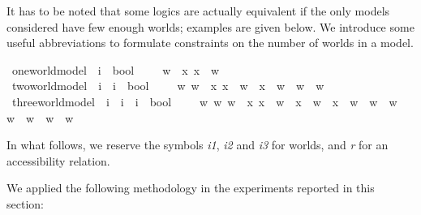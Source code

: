 \begin{isabellebody}
\begin{isamarkuptext}
It has to be noted that some logics are actually equivalent if the only models considered have few
enough worlds; examples are given below. We introduce some useful abbreviations to formulate
constraints on the number of worlds in a model.%
\end{isamarkuptext}%
\isamarkuptrue%
\isamarkupfalse%
\ one{\isacharunderscore}world{\isacharunderscore}model\ {\isacharcolon}{\isacharcolon}\ {\isachardoublequoteopen}i\ {\isasymRightarrow}\ bool{\isachardoublequoteclose}\ \ \ \ {\isachardoublequoteopen}{\isacharhash}\ w{}\ {\isasymequiv}\ {\isasymforall}x{\isachardot}\ x\ {\isacharequal}\ w{}{\isachardoublequoteclose}\isanewline
{}\isamarkupfalse%
\ two{\isacharunderscore}world{\isacharunderscore}model\ {\isacharcolon}{\isacharcolon}\ {\isachardoublequoteopen}i\ {\isasymRightarrow}\ i\ {\isasymRightarrow}\ bool{\isachardoublequoteclose}\ \ \ \ {\isachardoublequoteopen}{\isacharhash}\ w{}\ w{}\ {\isasymequiv}\ {\isacharparenleft}{\isasymforall}x{\isachardot}\ x\ {\isacharequal}\ w{}\ {\isasymor}\ x\ {\isacharequal}\ w{}{\isacharparenright}\ {\isasymand}\ w{}\ {\isasymnoteq}\ w{}{\isachardoublequoteclose}\ \isanewline
{}\isamarkupfalse%
\ three{\isacharunderscore}world{\isacharunderscore}model\ {\isacharcolon}{\isacharcolon}\ {\isachardoublequoteopen}i\ {\isasymRightarrow}\ i\ {\isasymRightarrow}\ i\ {\isasymRightarrow}\ bool{\isachardoublequoteclose}\ \ \ \ {\isachardoublequoteopen}{\isacharhash}\ w{}\ w{}\ w{}\ {\isasymequiv}\ {\isacharparenleft}{\isasymforall}x{\isachardot}\ x\ {\isacharequal}\ w{}\ {\isasymor}\ x\ {\isacharequal}\ w{}\ {\isasymor}\ x\ {\isacharequal}\ w{}{\isacharparenright}\ {\isasymand}\ w{}\ {\isasymnoteq}\ w{}\ {\isasymand}\ w{}\ {\isasymnoteq}\ w{}\ {\isasymand}\ w{}\ {\isasymnoteq}\ w{}{\isachardoublequoteclose}%
\begin{isamarkuptext}%
In what follows, we reserve the symbols \emph{i1}, \emph{i2} and \emph{i3} for worlds, and \emph{r} for an accessibility relation.%
\end{isamarkuptext}%
\isamarkuptrue%
%
\begin{isamarkuptext}%
We applied the following methodology in the experiments reported in this section:


\end{isamarkuptext}
\end{isabellebody}

